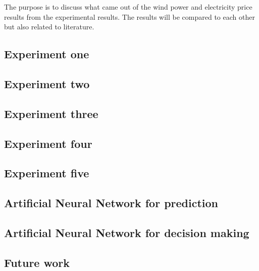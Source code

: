The purpose is to discuss what came out of the wind power and electricity price results from the experimental results. The results will be compared to each other but also related to literature.

\subsection{Experiment one}
\label{sec:inputParameterDiscussion}


\subsection{Experiment two}
\label{sec:matrixTrimmingDiscussion}


\subsection{Experiment three}
\label{sec:calculatedInputDiscussion}


\subsection{Experiment four}
\label{sec:blackBoxDiscussion}


\subsection{Experiment five}
\label{sec:stepAheadForecastingDiscussion}


\subsection{Artificial Neural Network for prediction}
\label{sec:annForPrediction}


\subsection{Artificial Neural Network for decision making}

\subsection{Future work}


